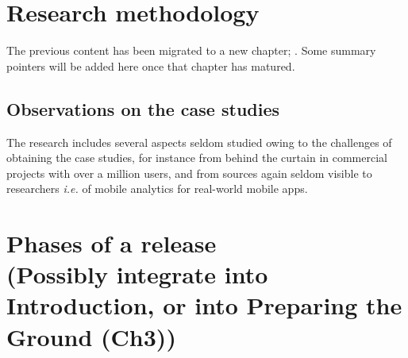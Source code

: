 
\clearpage
\section[Research methodology]{Research methodology}
The previous content has been migrated to a new chapter; . Some summary pointers will be added here once that chapter has matured.

\clearpage


\subsection{Observations on the case studies}
The research includes several aspects seldom studied owing to the challenges of obtaining the case studies, for instance from behind the curtain in commercial projects with over a million users, and from sources again seldom visible to researchers \emph{i.e.} of mobile analytics for real-world mobile apps.



\clearpage
\section[Phases of a release]{Phases of a release\\ \small{(Possibly integrate into Introduction, or into Preparing the Ground (Ch3))}}


